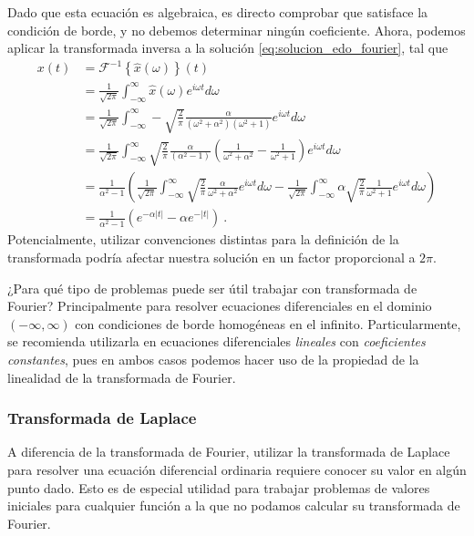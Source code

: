 \begin{ejemplo}
\begin{equation}
    \end{equation}
    Dado que esta ecuación es algebraica, es directo comprobar que satisface la condición de borde, y no debemos determinar ningún coeficiente. Ahora, podemos aplicar la transformada inversa a la solución \eqref{eq:solucion_edo_fourier}, tal que
    \begin{align}
        x(t) & = \mathcal{F}^{-1} \left\{ \hat{x}(\omega) \right\} (t) \nonumber \\
        & = \frac{1}{\sqrt{2\pi}} \int_{-\infty}^\infty \hat{x}(\omega) e^{i\omega t} d\omega \nonumber \\
        & = \frac{1}{\sqrt{2\pi}} \int_{-\infty}^\infty - \sqrt{\frac{2}{\pi}} \frac{\alpha}{(\omega^2 + \alpha^2) (\omega^2 + 1)} e^{i\omega t} d\omega \nonumber \\
        & = \frac{1}{\sqrt{2\pi}} \int_{-\infty}^\infty \sqrt{\frac{2}{\pi}} \frac{\alpha}{(\alpha^2 - 1)} \left( \frac{1}{\omega^2 + \alpha^2} - \frac{1}{\omega^2 + 1} \right) e^{i\omega t} d\omega \nonumber \\
        & = \frac{1}{\alpha^2 - 1} \left( \frac{1}{\sqrt{2\pi}} \int_{-\infty}^\infty \sqrt{\frac{2}{\pi}} \frac{\alpha}{\omega^2 + \alpha^2} e^{i\omega t} d\omega - \frac{1}{\sqrt{2\pi}} \int_{-\infty}^\infty \alpha \sqrt{\frac{2}{\pi}} \frac{1}{\omega^2 + 1} e^{i\omega t} d\omega \right) \nonumber \\
        & = \frac{1}{\alpha^2-1} \left( e^{-\alpha |t|} - \alpha e^{-|t|} \right)\ .
    \end{align}
    Potencialmente, utilizar convenciones distintas para la definición de la transformada podría afectar nuestra solución en un factor proporcional a $2\pi$.
\end{ejemplo}

¿Para qué tipo de problemas puede ser útil trabajar con transformada de Fourier? Principalmente para resolver ecuaciones diferenciales en el dominio $(-\infty, \infty)$ con condiciones de borde homogéneas en el infinito. Particularmente, se recomienda utilizarla en ecuaciones diferenciales \emph{lineales} con \emph{coeficientes constantes}, pues en ambos casos podemos hacer uso de la propiedad de la linealidad de la transformada de Fourier.

\subsubsection{Transformada de Laplace}

A diferencia de la transformada de Fourier, utilizar la transformada de Laplace para resolver una ecuación diferencial ordinaria requiere conocer su valor en algún punto dado. Esto es de especial utilidad para trabajar problemas de valores iniciales para cualquier función a la que no podamos calcular su transformada de Fourier.

